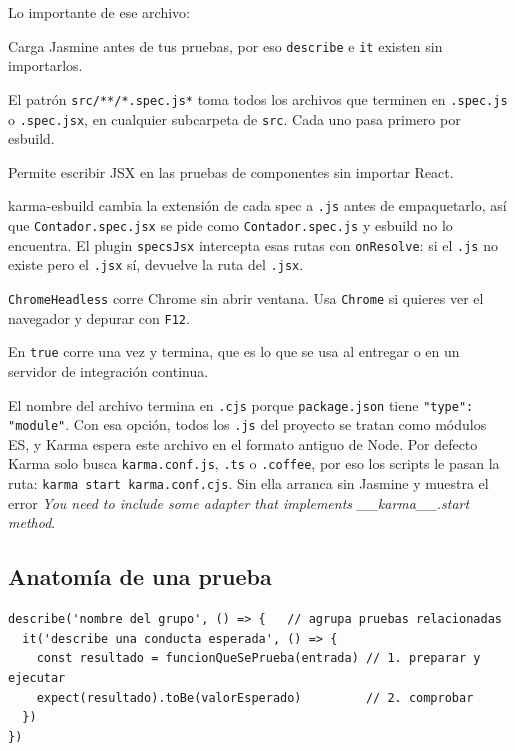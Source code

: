 \documentclass[11pt,a4paper]{article}
\newcommand{\cmd}[1]{\texttt{\color{reactdark}#1}}
\begin{document}
Lo importante de ese archivo:
\begin{description}[leftmargin=0pt, style=nextline, itemsep=0.4em]
\item[\texttt{frameworks: ['jasmine']}] Carga Jasmine antes de tus pruebas, por eso \cmd{describe} e \cmd{it} existen sin importarlos.
\item[\texttt{files} y \texttt{preprocessors}] El patrón \cmd{src/**/*.spec.js*} toma todos los archivos que terminen en \cmd{.spec.js} o \cmd{.spec.jsx}, en cualquier subcarpeta de \cmd{src}. Cada uno pasa primero por esbuild.
\item[\texttt{esbuild.jsx: 'automatic'}] Permite escribir JSX en las pruebas de componentes sin importar React.
\item[\texttt{esbuild.plugins: [specsJsx]}] karma-esbuild cambia la extensión de cada spec a \cmd{.js} antes de empaquetarlo, así que \cmd{Contador.spec.jsx} se pide como \cmd{Contador.spec.js} y esbuild no lo encuentra. El plugin \cmd{specsJsx} intercepta esas rutas con \cmd{onResolve}: si el \cmd{.js} no existe pero el \cmd{.jsx} sí, devuelve la ruta del \cmd{.jsx}.
\item[\texttt{browsers}] \cmd{ChromeHeadless} corre Chrome sin abrir ventana. Usa \cmd{Chrome} si quieres ver el navegador y depurar con \cmd{F12}.
\item[\texttt{singleRun}] En \cmd{true} corre una vez y termina, que es lo que se usa al entregar o en un servidor de integración continua.
\end{description}

\begin{nota}
El nombre del archivo termina en \cmd{.cjs} porque \cmd{package.json} tiene \cmd{"type": "module"}. Con esa opción, todos los \cmd{.js} del proyecto se tratan como módulos ES, y Karma espera este archivo en el formato antiguo de Node. Por defecto Karma solo busca \cmd{karma.conf.js}, \cmd{.ts} o \cmd{.coffee}, por eso los scripts le pasan la ruta: \cmd{karma start karma.conf.cjs}. Sin ella arranca sin Jasmine y muestra el error \emph{You need to include some adapter that implements \_\_karma\_\_.start method}.
\end{nota}

\subsection{Anatomía de una prueba}

\begin{lstlisting}[language=JSX]
describe('nombre del grupo', () => {   // agrupa pruebas relacionadas
  it('describe una conducta esperada', () => {
    const resultado = funcionQueSePrueba(entrada) // 1. preparar y ejecutar
    expect(resultado).toBe(valorEsperado)         // 2. comprobar
  })
})
\end{lstlisting}
\end{document}
